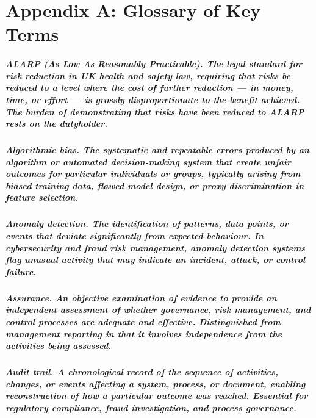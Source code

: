 \chapter*{Appendix A: Glossary of Key Terms}
\label{chap:Appendix A: Glossary of Key Terms}

\paragraph{\textbf{ALARP (As Low As Reasonably Practicable)}. The legal standard for risk reduction in UK health and safety law, requiring that risks be reduced to a level where the cost of further reduction — in money, time, or effort — is grossly disproportionate to the benefit achieved. The burden of demonstrating that risks have been reduced to ALARP rests on the dutyholder.}

\paragraph{\textbf{Algorithmic bias}. The systematic and repeatable errors produced by an algorithm or automated decision-making system that create unfair outcomes for particular individuals or groups, typically arising from biased training data, flawed model design, or proxy discrimination in feature selection.}

\paragraph{\textbf{Anomaly detection}. The identification of patterns, data points, or events that deviate significantly from expected behaviour. In cybersecurity and fraud risk management, anomaly detection systems flag unusual activity that may indicate an incident, attack, or control failure.}

\paragraph{\textbf{Assurance}. An objective examination of evidence to provide an independent assessment of whether governance, risk management, and control processes are adequate and effective. Distinguished from management reporting in that it involves independence from the activities being assessed.}

\paragraph{\textbf{Audit trail}. A chronological record of the sequence of activities, changes, or events affecting a system, process, or document, enabling reconstruction of how a particular outcome was reached. Essential for regulatory compliance, fraud investigation, and process governance.}

